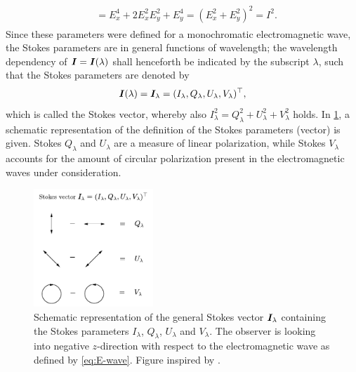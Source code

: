 \documentclass[a4paper,12pt]{report}
\begin{document}
\begin{align}
\begin{aligned}
&= E_x^4 + 2E_x^2E_y^2 + E_y^4 = (E_x^2+E_y^2)^2 = I^2.
\end{aligned}
\end{align} Since these parameters were defined for a monochromatic electromagnetic wave, the Stokes parameters are in general functions of wavelength; the wavelength dependency of $\bm{I} = \bm{I}(\lambda)$ shall henceforth be indicated by the subscript $\lambda$, such that the Stokes parameters are denoted by \begin{equation}
\bm{I}(\lambda) = \bm{I}_\lambda = (I_\lambda, Q_\lambda, U_\lambda, V_\lambda)^\top,
\end{equation} which is called the Stokes vector, whereby also $I_\lambda^2 = Q_\lambda^2 + U_\lambda^2 + V_\lambda^2$ holds. In \cref{fig:stokesvector}, a schematic representation of the definition of the Stokes parameters (vector) is given. Stokes $Q_\lambda$ and $U_\lambda$ are a measure of linear polarization, while Stokes $V_\lambda$ accounts for the amount of circular polarization present in the electromagnetic waves under consideration.
\begin{figure}[h]
\centering
\includegraphics[width=4.5cm]{figures/stokesvector.pdf}
\caption{Schematic representation of the general Stokes vector $\bm{I}_\lambda$ containing the Stokes parameters $I_\lambda$, $Q_\lambda$, $U_\lambda$ and $V_\lambda$. The observer is looking into negative $z$-direction with respect to the electromagnetic wave as defined by \cref{eq:E-wave}. Figure inspired by \cite[p.17]{DeglInnocenti.2005}.}
\label{fig:stokesvector}
\end{figure}
\end{document}
